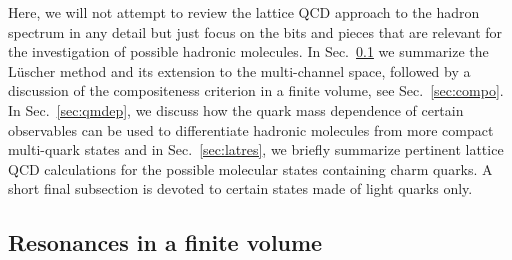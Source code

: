 Here, we will not attempt to review the lattice QCD approach to the hadron
spectrum in any detail but just focus on the bits and pieces that are relevant
for the investigation of possible hadronic molecules.
In Sec.~\ref{sec:reso} we summarize the L\"uscher method and its extension to
the multi-channel space, followed by a discussion of the compositeness criterion
in a finite volume, see Sec.~\ref{sec:compo}.
In Sec.~\ref{sec:qmdep}, we discuss how the quark mass dependence of certain
observables can be used to differentiate hadronic molecules from more compact
multi-quark states and in Sec.~\ref{sec:latres}, we briefly summarize pertinent
lattice QCD calculations for the possible molecular states containing charm
quarks. A short final subsection is devoted to certain states made of light
quarks only.


\subsection{Resonances in a finite volume}
\label{sec:reso}

